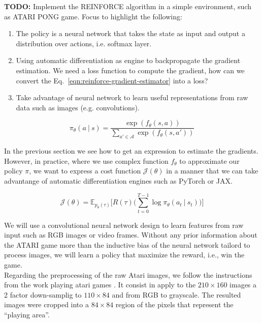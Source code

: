 \textbf{TODO:} Implement the REINFORCE algorithm in a simple environment, such as ATARI PONG game. Focus to highlight the following:

\begin{enumerate}
    \item The policy is a neural network that takes the state as input and output a distribution over actions, i.e. softmax layer.  
    \item Using automatic differentiation as engine to backpropagate the gradient estimation. We need a loss function to compute the gradient, how
    can we convert the Eq.~\ref{eqn:reinforce-gradient-estimator} into a loss?
    \item Take advantage of neural network to learn useful representations from raw data such as images (e.g. convolutions).
\end{enumerate}

\begin{equation}\label{eqn:neural-softmax-policies}
    \pi_{\theta}(a~|~s) = \frac{\exp(f_{\theta}(s, a))}{\sum_{a'\in\mathcal{A}}\exp(f_{\theta}(s, a'))}
\end{equation}

\noindent In the previous section we see how to get an expression to estimate the gradients. However, in practice, where we use complex function
$f_{\theta}$ to approximate our policy $\pi$, we want to express a cost
function $\mathcal{J}(\theta)$ in a manner that we can take advantange of 
automatic differentiation engines such as PyTorch or JAX.

\begin{equation}\label{eqn:reinforce-gradient-estimator-cost}
    \mathcal{J}(\theta) = \mathbb{E}_{p_{\theta}(\tau)}\bigg[R(\tau)\bigg(\sum_{t=0}^{T-1} \log \pi_{\theta} (a_t~|~s_t) \bigg)\bigg] 
\end{equation}

\noindent We will use a convolutional neural network design to learn features from raw input such as RGB images or video frames. Without any prior information about the ATARI game more than the inductive bias of the neural network tailord to process images, we will learn a policy that maximize the reward, i.e., win the game. \\


\noindent Regarding the preprocessing of the raw Atari images, we follow the instructions
from the work playing atari games \cite{mnih2013playing}. It consist in
apply to the $210\times 160$ images a 2 factor down-samplig to $110\times 84$
and from RGB to grayscale. The resulted images were cropped into a $84\times84$
region of the pixels that represent the ``playing area''.

